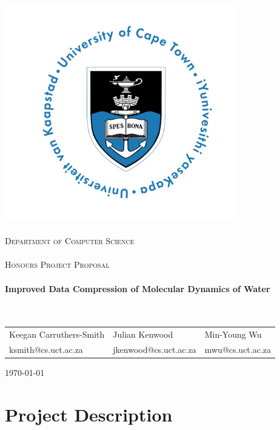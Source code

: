 \documentclass[a4paper,twocolumn]{article}
\begin{document}
\begin{titlepage}
\begin{center}
\includegraphics[width=100mm]{uct}\\
\ \\
\textsc{\Large
Department of Computer Science\\
\ \\
Honours Project Proposal\\
\ \\}
%
%
{\huge \bfseries
Improved Data Compression of Molecular Dynamics of Water
\\}
\ \\
\ \\

\begin{center}
  \begin{tabular}{lll}
    \large Keegan Carruthers-Smith & \large Julian Kenwood & \large Min-Young Wu
    \\
    \small{ksmith@cs.uct.ac.za} & \small{jkenwood@cs.uct.ac.za} & \small{mwu@cs.uct.ac.za} \\
  \end{tabular}
\end{center}

\vfill %
%
{\large \today}
%
\end{center}
\end{titlepage}

\section{Project Description}
\end{document}
